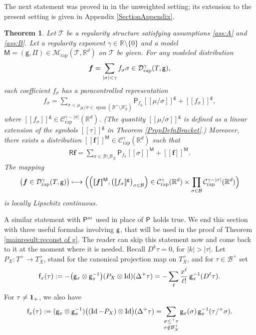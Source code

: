 \documentclass[JEP,XML,SOM,Unicode,published]{cedram}
\newcommand\mto{\mathchoice{\longmapsto}{\mapsto}{\mapsto}{\mapsto}}
\DeclareMathOperator{\Span}{span}
\theoremstyle{plain}
\newtheorem{thm}{Theorem}
\theoremstyle{definition}
\DeclareMathOperator{\iden}{Id}
\newcommand{\Brac}[1]{[\![#1]\!]}
\newcommand{\bsf}{\boldsymbol{f}}
\newcommand{\rap}{\mathrm{rap}}
\newcommand{\reR}{\boldsymbol{\mathsf{R}}}
\newcommand{\sfM}{\mathsf{M}}
\newcommand{\sfP}{\mathsf{P}}
\newcommand{\sff}{\mathsf{f}}
\newcommand{\sfg}{\mathsf{g}}
\newcommand{\sfPi}{\mathsf{\Pi}}
\newcommand{\scrM}{\mathscr{M}}
\newcommand{\scrT}{\mathscr{T}}
\newcommand{\bbR}{\mathbb{R}}
\newcommand{\mcB}{\mathcal{B}}
\newcommand{\mcC}{\mathcal{C}}
\newcommand{\mcD}{\mathcal{D}}
\begin{document}
The next statement was proved in \cite[Th.\,14]{BH} in the unweighted setting; its extension to the present setting is given in Appendix \ref{SectionAppendix}.

\begin{thm} \label{thm:MD to PD}
Let $\scrT$ be a regularity structure satisfying assumptions \eqref{ass:A} and \eqref{ass:B}. Let a regularity exponent $\gamma\in\bbR\setminus\{0\}$ and a model $\sfM=(\sfg,\sfPi)\in\scrM_\rap(\scrT,\bbR^d)$ on $\scrT$ be given. For any modeled distribution
\[
\bsf=\sum_{|\sigma|<\gamma}f_\sigma\sigma\in\mcD_\rap^\gamma(T,\sf g),
\]
each coefficient $f_\sigma$ has a paracontrolled representation
\begin{align}\label{eq:para system}
f_\sigma = \underset{\mu/\sigma\in\Span(\mcB^+\setminus\mcB_X^+)}{\sum_{\sigma<\mu}} \sfP_{f_\mu}\Brac{\mu/\sigma}^\sfg + \Brac{f_\sigma}^\sfg,
\end{align}
where $\Brac{f_\sigma}^\sfg\in \mcC_\rap^{\gamma-|\sigma|}(\bbR^d)$. (The quantity $\Brac{\mu/\sigma}^{\sfg}$ is defined as a linear extension of the symbols $\Brac{\tau}^{\sfg}$ in Theorem \ref{PropDefnBracket}.) Moreover, there exists a distribution $\Brac{\bsf}^\sfM\in \mcC_\rap^\gamma(\bbR^d)$ such that
\begin{align}\label{eq:para reconst}
\reR\bsf=\sum_{\sigma\in\mcB\setminus\mcB_{\underline{X}}} \sfP_{f_\sigma}\Brac{\sigma}^\sfM+\Brac{\bsf}^\sfM.
\end{align}
The mapping
\[
\bigl(\bsf\in\mcD_\rap^\gamma(T,{\sf g})\bigr)\mto \Bigl( \Bigl(\Brac{\bsf}^\sfM,\bigl(\Brac{f_\sigma}^\sfg\bigr)_{\sigma\in\mcB}\Bigr) \in \mcC^\gamma_\rap(\bbR^d)\times\prod_{\sigma\in\mcB} \mcC^{\gamma-\vert\sigma\vert}_\rap(\bbR^d) \Bigr)
\]
is locally Lipschitz continuous.
\end{thm}

A similar statement with ${\sf P}^m$ used in place of $\sf P$ holds true. We end this section with three useful formulas involving $\sf g$, that will be used in the proof of Theorem \ref{mainresult:reconst of g}. The reader can skip this statement now and come back to it at the moment where it is needed. Recall $D^k\tau=0$, for $\vert k\vert>\vert\tau\vert$. Let $P_X: T^+\to T^+_X$, stand for the canonical projection map on $T^+_X$, and for $\tau\in\mcB^+$ set
\begin{equation*}
\sff_x(\tau) := - \bigl({\sf g}_x\otimes {\sf g}_x^{-1}\bigr)(P_X\otimes\iden)(\Delta^+\tau) 
 = - \sum_{\ell}\frac{x^\ell}{\ell!} \, \sfg_x^{-1}(D^\ell\tau).
\end{equation*}
For $\tau\neq {\bf 1}_+$, we also have
\begin{equation*}
\sff_x(\tau) := ({\sf g}_x\otimes {\sf g}_x^{-1}) \bigl((\iden-P_X)\otimes\iden\bigr)
(\Delta^+\tau) = \sum_{\substack{\sigma\leq^+\tau\\\sigma\notin\mcB_X^+}} \sfg_x(\sigma)\,\sfg_x^{-1}(\tau/^+\sigma).
\end{equation*}
\end{document}
